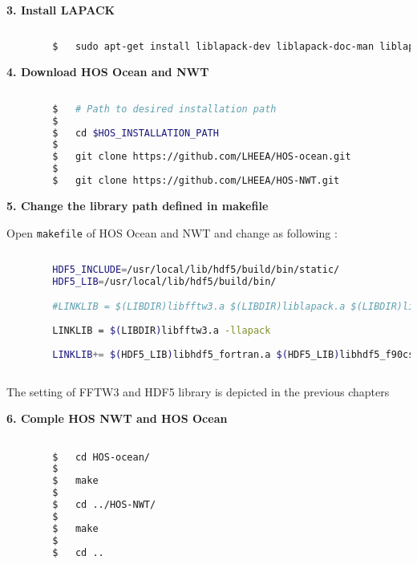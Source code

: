		\vspace{1em}
		\textbf{3. Install LAPACK}
		
		\begin{lstlisting}[language=bash]
		
		$	sudo apt-get install liblapack-dev liblapack-doc-man liblapack-doc liblapack-pic liblapack3 liblapack-test liblapack3gf liblapacke liblapacke-dev
		\end{lstlisting}
		
		\vspace{1em}
		\textbf{4. Download HOS Ocean and NWT}
		
		\begin{lstlisting}[language=bash]
		
		$	# Path to desired installation path
		$
		$	cd $HOS_INSTALLATION_PATH
		$
		$	git clone https://github.com/LHEEA/HOS-ocean.git
		$
		$	git clone https://github.com/LHEEA/HOS-NWT.git		
		\end{lstlisting}
		
		\vspace{1em}
		\textbf{5. Change the library path defined in makefile}
		
		Open \texttt{makefile} of HOS Ocean and NWT and change as following : 
		
		\begin{lstlisting}[language=bash]
		
		HDF5_INCLUDE=/usr/local/lib/hdf5/build/bin/static/
		HDF5_LIB=/usr/local/lib/hdf5/build/bin/

		#LINKLIB = $(LIBDIR)libfftw3.a $(LIBDIR)liblapack.a $(LIBDIR)librefblas.a
		
		LINKLIB = $(LIBDIR)libfftw3.a -llapack
		
		LINKLIB+= $(HDF5_LIB)libhdf5_fortran.a $(HDF5_LIB)libhdf5_f90cstub.a $(HDF5_LIB)libhdf5.a $(HDF5_LIB)libszip.a $(HDF5_LIB)libz.a -ldl -pthread
		
		\end{lstlisting}
		
		The setting of FFTW3 and HDF5 library is depicted in the previous chapters
		
		\pagebreak
		
		\vspace{0.2cm}
		\textbf{6. Comple HOS NWT and HOS Ocean}
		
		\begin{lstlisting}[language=bash]

		$	cd HOS-ocean/
		$
		$	make
		$	
		$	cd ../HOS-NWT/
		$
		$	make
		$
		$	cd ..		
		\end{lstlisting}
		
